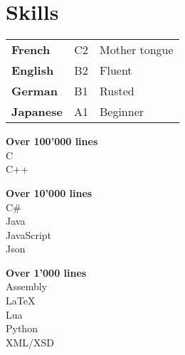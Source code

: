 \documentclass[a4paper]{deedy-resume} %
\begin{document}
\begin{minipage}[t]{0.33\textwidth} %

\section{Skills}


	\begin{tabular}{lcl}
		\textbf{French} & C2 & Mother tongue \\
		\textbf{English} & B2 & Fluent \\
		\textbf{German} & B1 & Rusted \\
		\textbf{Japanese} & A1 & Beginner \\
	\end{tabular}

\sectionspace

	\vspace{\topsep} %
	\begin{tightitemize}
		\item \textbf{Over 100'000 lines} \\ 
			\textbullet{} C \\
			\textbullet{} C++ \\
		\item \textbf{Over 10'000 lines} \\ 
			\textbullet{} C\# \\ 
			\textbullet{} Java \\
			\textbullet{} JavaScript \\
			\textbullet{} Json \\
		\item \textbf{Over 1'000 lines} \\ 
			\textbullet{} Assembly \\
			\textbullet{} \LaTeX \\
			\textbullet{} Lua \\
			\textbullet{} Python \\
			\textbullet{} XML/XSD \\
	\end{tightitemize}

\sectionspace


\end{minipage}
\end{document}
